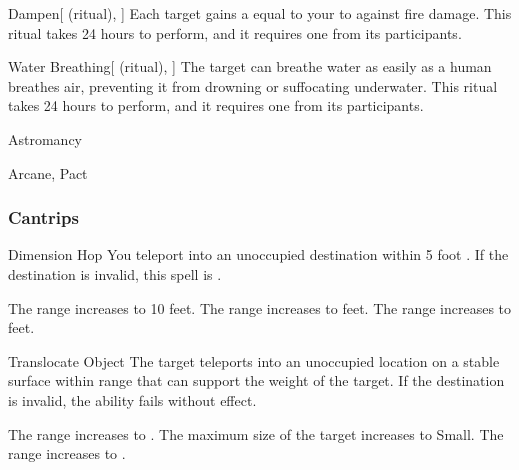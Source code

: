 \lowercase{\hypertarget{spell:Dampen}{}}\label{spell:Dampen}
\begin{attuneability}[Rank 1]{\hypertarget{spell:Dampen}{Dampen}}[ (ritual), ]
Each target gains a  equal to your  to  against fire damage.
This ritual takes 24 hours to perform, and it requires one  from its participants.
\end{attuneability}
\vspace{0.25em}



\lowercase{\hypertarget{spell:Water Breathing}{}}\label{spell:Water Breathing}
\begin{attuneability}[Rank 3]{\hypertarget{spell:Water Breathing}{Water Breathing}}[ (ritual), ]
The target can breathe water as easily as a human breathes air, preventing it from drowning or suffocating underwater.
This ritual takes 24 hours to perform, and it requires one  from its participants.
\end{attuneability}
\vspace{0.25em}


\newpage
\begin{spellsection}{Astromancy}

\begin{spellheader}
\end{spellheader}


 Arcane, Pact

\subsubsection{Cantrips}


\begin{freeability}{Dimension Hop}
You teleport into an unoccupied destination within 5 foot .
If the destination is invalid, this spell is .

\rankline
{} The range increases to 10 feet.
 The range increases to \rngclose feet.
 The range increases to \rngmed feet.
\end{freeability}


\begin{freeability}{Translocate Object}
The target teleports into an unoccupied location on a stable surface within range that can support the weight of the target.
If the destination is invalid, the ability fails without effect.

\rankline
{} The range increases to \rngmed.
 The maximum size of the target increases to Small.
 The range increases to \rnglong.
\end{freeability}

\end{spellsection}


